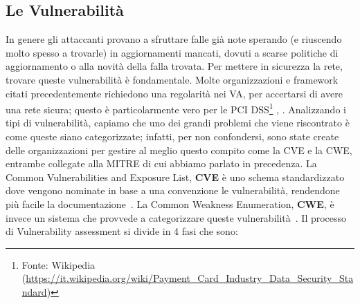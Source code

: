     \subsection{Le Vulnerabilità}
        In genere gli attaccanti provano a sfruttare falle già note sperando (e riuscendo molto spesso a trovarle) in aggiornamenti mancati, dovuti a scarse politiche di aggiornamento o alla novità della falla trovata. Per mettere in sicurezza la rete, trovare queste vulnerabilità è fondamentale. Molte organizzazioni e framework citati precedentemente richiedono una regolarità nei VA, per accertarsi di avere una rete sicura; questo è particolarmente vero per le PCI DSS\footnote{Fonte: Wikipedia (\url{https://it.wikipedia.org/wiki/Payment_Card_Industry_Data_Security_Standard})} \cite{scada_system}, \cite{VAPT_Techniques}.
        Analizzando i tipi di vulnerabilità, capiamo che uno dei grandi problemi che viene riscontrato è come queste siano categorizzate; infatti, per non confondersi, sono state create delle organizzazioni per gestire al meglio questo compito come la CVE e la CWE, entrambe collegate alla MITRE di cui abbiamo parlato in precedenza. La Common Vulnerabilities and Exposure List, \textbf{CVE} è uno schema standardizzato dove vengono nominate in base a una convenzione le vulnerabilità, rendendone più facile la documentazione~\cite{cve}. La Common Weakness Enumeration, \textbf{CWE}, è invece un sistema che provvede a categorizzare queste vulnerabilità~\cite{cwe}.
        Il processo di Vulnerability assessment si divide in 4 fasi che sono:
